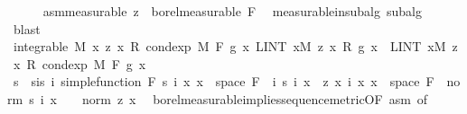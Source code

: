 \begin{isabellebody}
\ \ \ \ \isamarkupfalse%
\ asm{\isacharprime}{\kern0pt}{\isacharbrackleft}{\kern0pt}measurable{\isacharbrackright}{\kern0pt}{\isacharcolon}{\kern0pt}\ {\isachardoublequoteopen}z\ {\isasymin}\ borel{\isacharunderscore}{\kern0pt}measurable\ F{\isachardoublequoteclose}\ \isamarkupfalse%
\ measurable{\isacharunderscore}{\kern0pt}in{\isacharunderscore}{\kern0pt}subalg{\isacharprime}{\kern0pt}\ subalg\ \isamarkupfalse%
\ blast\isanewline
\ \ \ \ \isamarkupfalse%
\ {\isachardoublequoteopen}integrable\ M\ {\isacharparenleft}{\kern0pt}{\isasymlambda}x{\isachardot}{\kern0pt}\ z\ x\ {\isacharasterisk}{\kern0pt}\isactrlsub R\ cond{\isacharunderscore}{\kern0pt}exp\ M\ F\ g\ x{\isacharparenright}{\kern0pt}{\isachardoublequoteclose}\ {\isachardoublequoteopen}LINT\ x{\isacharbar}{\kern0pt}M{\isachardot}{\kern0pt}\ z\ x\ {\isacharasterisk}{\kern0pt}\isactrlsub R\ g\ x\ {\isacharequal}{\kern0pt}\ LINT\ x{\isacharbar}{\kern0pt}M{\isachardot}{\kern0pt}\ z\ x\ {\isacharasterisk}{\kern0pt}\isactrlsub R\ cond{\isacharunderscore}{\kern0pt}exp\ M\ F\ g\ x{\isachardoublequoteclose}\isanewline
\ \ \ \ \isamarkupfalse%
\ {\isacharminus}{\kern0pt}\isanewline
\ \ \ \ \ \ \isamarkupfalse%
\ s\ \ s{\isacharunderscore}{\kern0pt}is{\isacharcolon}{\kern0pt}\ {\isachardoublequoteopen}{\isasymAnd}i{\isachardot}{\kern0pt}\ simple{\isacharunderscore}{\kern0pt}function\ {\isacharquery}{\kern0pt}F\ {\isacharparenleft}{\kern0pt}s\ i{\isacharparenright}{\kern0pt}{\isachardoublequoteclose}\ {\isachardoublequoteopen}{\isasymAnd}x{\isachardot}{\kern0pt}\ x\ {\isasymin}\ space\ {\isacharquery}{\kern0pt}F\ {\isasymLongrightarrow}\ {\isacharparenleft}{\kern0pt}{\isasymlambda}i{\isachardot}{\kern0pt}\ s\ i\ x{\isacharparenright}{\kern0pt}\ {\isasymlonglonglongrightarrow}\ z\ x{\isachardoublequoteclose}\ {\isachardoublequoteopen}{\isasymAnd}i\ x{\isachardot}{\kern0pt}\ x\ {\isasymin}\ space\ {\isacharquery}{\kern0pt}F\ {\isasymLongrightarrow}\ norm\ {\isacharparenleft}{\kern0pt}s\ i\ x{\isacharparenright}{\kern0pt}\ {\isasymle}\ {}\ {\isacharasterisk}{\kern0pt}\ norm\ {\isacharparenleft}{\kern0pt}z\ x{\isacharparenright}{\kern0pt}{\isachardoublequoteclose}\ \isamarkupfalse%
\ borel{\isacharunderscore}{\kern0pt}measurable{\isacharunderscore}{\kern0pt}implies{\isacharunderscore}{\kern0pt}sequence{\isacharunderscore}{\kern0pt}metric{\isacharbrackleft}{\kern0pt}OF\ asm{\isacharparenleft}{\kern0pt}{}{\isacharparenright}{\kern0pt}{\isacharcomma}{\kern0pt}\ of\ {}{\isacharbrackright}{\kern0pt}\ \isamarkupfalse%

\end{isabellebody}
